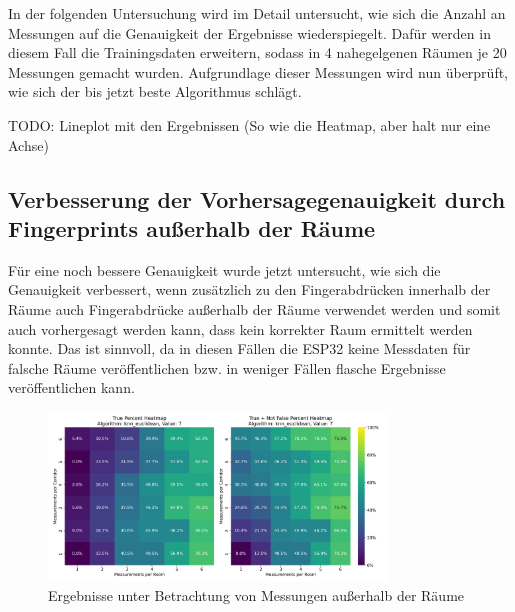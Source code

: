 In der folgenden Untersuchung wird im Detail untersucht, wie sich die Anzahl an Messungen auf die Genauigkeit der Ergebnisse wiederspiegelt. Dafür werden in diesem Fall die Trainingsdaten erweitern, sodass in 4 nahegelgenen Räumen je 20 Messungen gemacht wurden. Aufgrundlage dieser Messungen wird nun überprüft, wie sich der bis jetzt beste Algorithmus schlägt.

TODO: Lineplot mit den Ergebnissen (So wie die Heatmap, aber halt nur eine Achse)

\subsection{Verbesserung der Vorhersagegenauigkeit durch Fingerprints außerhalb der Räume}

Für eine noch bessere Genauigkeit wurde jetzt untersucht, wie sich die Genauigkeit verbessert, wenn zusätzlich zu den Fingerabdrücken innerhalb der Räume auch Fingerabdrücke außerhalb der Räume verwendet werden und somit auch vorhergesagt werden kann, dass kein korrekter Raum ermittelt werden konnte. Das ist sinnvoll, da in diesen Fällen die ESP32 keine Messdaten für falsche Räume veröffentlichen bzw. in weniger Fällen flasche Ergebnisse veröffentlichen kann.

\begin{figure}[H]
    \centering
    \includegraphics[width=0.8\textwidth]{images/8_test_corrdior_01.png}
    \caption{Ergebnisse unter Betrachtung von Messungen außerhalb der Räume}
    \label{fig:8_test_corrdior_01}
\end{figure}
